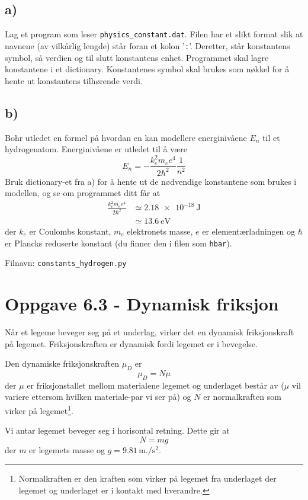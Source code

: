 \documentclass[10pt,a4paper]{article}
\begin{document}
\subsection*{a)}
Lag et program som leser \texttt{physics\_constant.dat}. Filen har et slikt format slik at navnene (av vilkårlig lengde) står foran et kolon '\texttt{:}'. Deretter, står konstantens symbol, så verdien og til slutt konstantens enhet.  Programmet skal lagre konstantene i et dictionary. Konstantenes symbol skal brukes som nøkkel for å hente ut konstantens tilhørende verdi. 
\subsection*{b)}
Bohr utledet en formel på hvordan en kan modellere energinivåene $E_n$ til et hydrogenatom. Energinivåene er utledet til å være
\[
E_n =  -\frac{k_e^2m_ee^4}{2\hbar^2} \frac{1}{n^2}
\]
Bruk dictionary-et fra a) for å hente ut de nødvendige konstantene som brukes i modellen, og se om programmet ditt får at 
\begin{align*}
 \frac{k_e^2m_ee^4}{2\hbar^2} &\simeq \SI{2.18e-18}{\joule}\\
 &\simeq \SI{13.6}{\electronvolt} 
\end{align*}
der $k_e$ er Coulombs konstant, $m_e$ elektronets masse, $e$ er elementærladningen og $\hbar$ er Plancks reduserte konstant (du finner den i filen som \texttt{hbar}). 
 
Filnavn: \texttt{constants\_hydrogen.py}
 
\section*{Oppgave 6.3 - Dynamisk friksjon}
Når et legeme beveger seg på et underlag, virker det en dynamisk friksjonskraft på legemet. Friksjonskraften er dynamisk fordi legemet er i bevegelse. 
 
Den dynamiske friksjonskraften $\mu_D$ er
\[
\mu_D = N\mu
\]
der $\mu$ er friksjonstallet mellom materialene legemet og underlaget består av ($\mu$ vil variere ettersom hvilken materiale-par vi ser på) og $N$ er normalkraften som virker på legemet\footnote{Normalkraften er den kraften som virker på legemet fra underlaget der legemet og underlaget er i kontakt med hverandre.}.
 
Vi antar legemet beveger seg i horisontal retning. Dette gir at 
\[
N = mg
\]
der $m$ er legemets masse og $g = 9.81\,\si{\meter.\per\square\second}$. 
 
\end{document}

